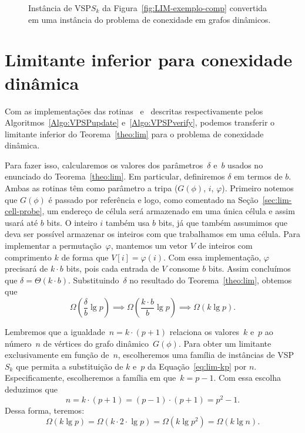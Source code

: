 \begin{figure}[htb]
\centering
\scalebox{.85}{

}
\caption{Instância de VSP$S_k$ da Figura~\ref{fig:LIM-exemplo-comp} convertida em uma instância do problema de conexidade em grafos dinâmicos.}
\label{fig:LIM-exemplo-verify}
\end{figure}

\section{Limitante inferior para conexidade dinâmica}

Com as implementações das rotinas~\VPSPupdate{} e~\VPSPverify{} descritas respectivamente pelos Algoritmos~\ref{Algo:VPSPupdate} e~\ref{Algo:VPSPverify}, podemos transferir o limitante inferior do Teorema~\ref{theo:lim} para o problema de conexidade dinâmica. 

Para fazer isso, calcularemos os valores dos parâmetros~$\delta$ e~$b$ usados no enunciado do Teorema~\ref{theo:lim}. Em particular, definiremos  $\delta$ em termos de $b$. Ambas as rotinas têm como parâmetro a tripa ($G(\phi)$, $i$, $\varphi$). Primeiro notemos que $G(\phi)$ é passado por referência e logo, como comentado na Seção~\ref{sec:lim-cell-probe}, um endereço de célula será armazenado em uma única célula e assim usará até $b$ bits. O inteiro $i$ também usa $b$ bits, já que também assumimos que deva ser possível armazenar os inteiros com que trabalhamos em uma célula. Para implementar a permutação~$\varphi$, mantemos um vetor $V$ de inteiros com comprimento $k$ de forma que $V[i] = \varphi(i)$. Com essa implementação, $\varphi$ precisará de $k\cdot b$
bits, pois cada entrada de $V$ consome $b$ bits. Assim concluímos que $\delta = \Theta(k\cdot b)$.  Substituindo~$\delta$ no resultado do Teorema~\ref{theo:lim}, obtemos que
\begin{equation}
\Omega\left( \frac{\delta}{b}\lg p \right)\implies \Omega\left(\frac{k\cdot b}{b}\lg p\right)\implies \Omega(k\lg p).\label{eq:lim-kp}
\end{equation}

Lembremos que a igualdade~$n=k\cdot (p+1)$ relaciona os valores~$k$ e~$p$ ao número~$n$ de vértices do grafo dinâmico~$G(\phi)$. Para obter um limitante exclusivamente em função de~$n$, escolheremos uma família de instâncias de VSP$S_k$ que permita a substituição de $k$ e~$p$ da Equação~\eqref{eq:lim-kp} por $n$. Especificamente, escolheremos a família em que~$k = p-1$. Com essa escolha deduzimos que
$$
n =k\cdot (p+1) =(p-1)\cdot  (p+1) =p^2-1.
$$
Dessa forma, teremos:
$$
\Omega(k \lg p) = \Omega(k\cdot  2\cdot \lg p) = \Omega(k \lg p^2) \nonumber = \Omega(k \lg n).
$$

